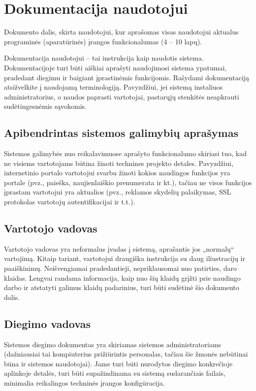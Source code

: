 \documentclass{ktuthesis}
\begin{document}
	\section{Dokumentacija naudotojui}
	
	Dokumento dalis, skirta naudotojui, kur aprašomas visas naudotojui aktualus programinės (aparatūrinės) įrangos funkcionalumas (4 – 10 lapų).
	
	Dokumentacija naudotojui – tai instrukcija kaip naudotis sistema. Dokumentacijoje turi būti aiškiai aprašyti naudojimosi sistema ypatumai, pradedant
	diegimu ir baigiant įprastinėmis funkcijomis. Rašydami dokumentaciją atsižvelkite į naudojamą terminologiją. Pavyzdžiui, jei sistemą instaliuos administratorius,
	o naudos paprasti vartotojai, pastarųjų stenkitės neapkrauti sudėtingesnėmis sąvokomis.
	
	\subsection{Apibendrintas sistemos galimybių aprašymas}
	
	Sistemos galimybės nuo reikalavimuose aprašyto funkcionalumo skiriasi tuo, kad ne visiems vartotojams būtina žinoti technines projekto detales.
	Pavyzdžiui, internetinio portalo vartotojui svarbu žinoti kokios naudingos funkcijos yra portale (pvz., paieška, naujienlaiškio prenumerata ir kt.),
	tačiau ne visos funkcijos įprastam vartotojui yra aktualios (pvz., reklamos skydelių palaikymas, SSL protokolas vartotojų autentifikacijai ir t.t.).
	
	\subsection{Vartotojo vadovas}
	
	Vartotojo vadovas yra neformalus įvadas į sistemą, aprašantis jos „normalų“ vartojimą. Kitaip tariant, vartotojui draugiška instrukcija su daug
	iliustracijų ir paaiškinimų. Neišvengiamai pradedantieji, nepriklausomai nuo patirties, daro klaidas. Lengvai randama informacija, kaip nuo šių
	klaidų grįžti prie naudingo darbo ir atstatyti galimus klaidų padarinius, turi būti sudėtinė šio dokumento dalis.
	
	\subsection{Diegimo vadovas}
	
	Sistemos diegimo dokumentas yra skiriamas sistemos administratoriams (dažniausiai tai kompiuterius prižiūrintis personalas, tačiau šie žmonės
	nebūtinai būna ir sistemos naudotojai). Jame turi būti nurodytos diegimo konkrečioje aplinkoje detalės, turi būti supažindinama su sistemą
	sudarančiais failais, minimalia reikalingos techninės įrangos konfigūracija.
	
\end{document}
